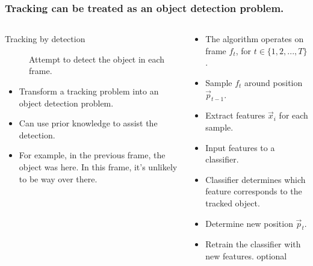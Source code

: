 \begin{frame}
    \frametitle{Tracking can be treated as an object detection problem.}
    \begin{columns}[T]
        \begin{column}{0.5\textwidth}
            \begin{description}
                \item [Tracking by detection] Attempt to detect the object in each frame.
            \end{description}
            \begin{itemize}
                \item Transform a tracking problem into an object detection problem.
                \item Can use prior knowledge to assist the detection.
                \item For example, in the previous frame, the object was here. In this frame, it's
                    unlikely to be way over there.
            \end{itemize}
        \end{column}
        \begin{column}{0.5\textwidth}
            \begin{itemize}
                \item The algorithm operates on frame \(f_t\), for \(t \in \{1, 2, ..., T\}\).
                \item Sample \(f_t\) around position \(\vec{p}_{t-1}\).
                \item Extract features \(\vec{x}_i\) for each sample.
                \item Input features to a classifier.
                \item Classifier determines which feature corresponds to the tracked object.
                \item Determine new position \(\vec{p}_t\).
                \item Retrain the classifier with new features. \alert{optional}
            \end{itemize}
        \end{column}
    \end{columns}
\end{frame}

